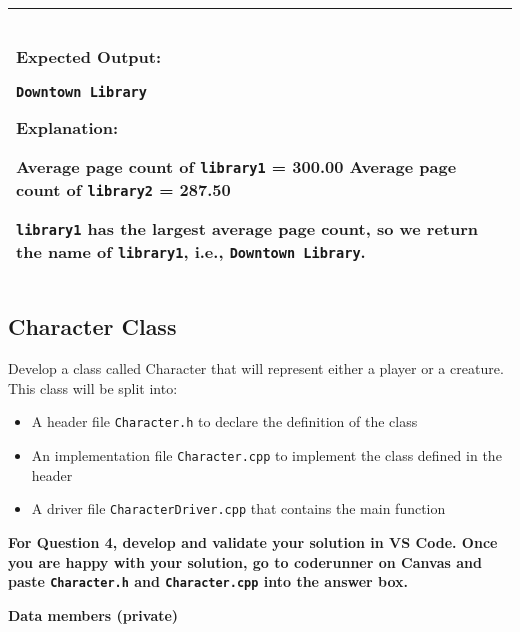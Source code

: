 \begin{longtable}{|p{1.7in}|p{4.3in}|}
\begin{example}
\begin{verbatim}
\end{verbatim}
\end{example}


\textbf{Expected Output:} 

\vspace{5pt}
\texttt{Downtown Library} 
\vspace{5pt}

\textbf{Explanation:} 

\vspace{5pt}
Average page count of \texttt{library1} = 300.00 \newline
Average page count of \texttt{library2} = 287.50 \newline

\texttt{library1} has the largest average page count, so we return the name of \texttt{library1}, i.e., \texttt{Downtown Library}.
\vspace{5pt} \\ \hline

\end{longtable}


\vspace{5pt}

\subsection{Character Class} 

Develop a class called Character that will represent either a player or a creature. This class will be split into:

\begin{itemize}
    \item A header file \texttt{Character.h} to declare the definition of the class
    \item  An implementation file \texttt{Character.cpp} to implement the class defined in the header
    \item  A driver file \texttt{CharacterDriver.cpp} that contains the main function
\end{itemize}


\textbf{For Question 4, develop and validate your solution in VS Code. Once you are happy with your solution, go to coderunner on Canvas and paste \texttt{Character.h} and \texttt{Character.cpp} into the answer box.} 

\vspace{10pt}

\textbf{Data members (private)}

